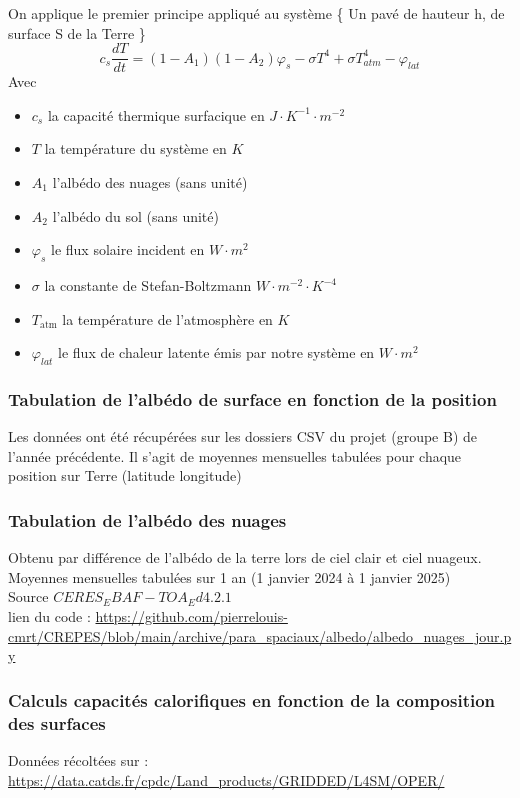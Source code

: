 \documentclass[a4paper,12pt]{article}
\begin{document}
On applique le premier principe appliqué au système \{ Un pavé de hauteur h, de surface S de la Terre \}
\ \ 
\[
c_s \frac{dT}{dt} =(1-A_1)(1-A_2)\varphi_s-\sigma T^4+\sigma T_{atm}^4-\varphi_{lat}
\]
Avec
\begin{itemize}
    \item \(c_s\) la capacité thermique surfacique en \(J\cdot K^{-1}\cdot m^{-2}\)
     \item  \(T\) la température du système en \(K\)
    \item \(A_1\) l'albédo des nuages (sans unité)
    \item \(A_2\) l'albédo du sol (sans unité)
    \item \(\varphi_s\) le flux solaire incident en \(W \cdot m^2\)
 \item \(\sigma\) la constante de Stefan-Boltzmann \(W \cdot m^{-2} \cdot K^{-4}\)
    \item \(T_\text{atm}\) la température de l'atmosphère en \(K\)    
    
    \item \(\varphi_{lat}\) le flux de chaleur latente émis par notre système en \(W \cdot m^2\)
\end{itemize}



\vspace{0.5cm}
\subsubsection{Tabulation de l'albédo de surface en fonction de la position }
Les données ont été récupérées sur les dossiers CSV du projet (groupe B)  de l'année précédente. Il s'agit de moyennes mensuelles tabulées pour chaque position sur Terre (latitude longitude)
\subsubsection{Tabulation de l'albédo des nuages}
Obtenu par différence de l'albédo de la terre lors de ciel clair et ciel nuageux.
Moyennes mensuelles tabulées sur 1 an (1 janvier 2024 à 1 janvier 2025)
\\
Source \(CERES_EBAF-TOA_Ed4.2.1\)
\\
lien du code : \url{https://github.com/pierrelouis-cmrt/CREPES/blob/main/archive/para_spaciaux/albedo/albedo_nuages_jour.py}

\subsubsection{Calculs capacités calorifiques en fonction de la composition des surfaces}
Données récoltées sur : 
\url{https://data.catds.fr/cpdc/Land_products/GRIDDED/L4SM/OPER/}
\end{document}
